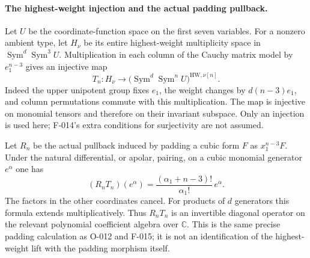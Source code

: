 \paragraph{The highest-weight injection and the actual padding pullback.}
Let \(U\) be the coordinate-function space on the first
seven variables. For a nonzero ambient type, let \(H_\nu\)
be its entire highest-weight multiplicity space in
\(\operatorname{Sym}^d\operatorname{Sym}^3 U\).
Multiplication in each column of the Cauchy matrix model
by \(e_1^{n-3}\) gives an injective map
\[
 T_n:H_\nu\longrightarrow
           \bigl(\operatorname{Sym}^d\operatorname{Sym}^n U\bigr)
                          ^{\mathrm{HW},\nu[n]}.
                                                               \tag{F-026.3}
\]
Indeed the upper unipotent group fixes \(e_1\), the
weight changes by \(d(n-3)e_1\), and column permutations
commute with this multiplication. The map is injective on
monomial tensors and therefore on their invariant subspace.
Only an injection is used here; F-014's extra conditions
for surjectivity are not assumed.

Let \(R_n\) be the actual pullback induced by padding a
cubic form \(F\) as \(x_1^{n-3}F\).
Under the natural differential, or apolar, pairing, on a
cubic monomial generator \(e^\alpha\) one has
\[
       (R_nT_n)(e^\alpha)
          =\frac{(\alpha_1+n-3)!}{\alpha_1!}\,e^\alpha.
                                                               \tag{F-026.4}
\]
The factors in the other coordinates cancel. For products
of \(d\) generators this formula extends multiplicatively.
Thus \(R_nT_n\) is an invertible diagonal operator on
the relevant polynomial coefficient algebra over
\(\mathbb C\). This is the same precise padding
calculation as O-012 and F-015; it is not an identification
of the highest-weight lift with the padding morphism itself.

